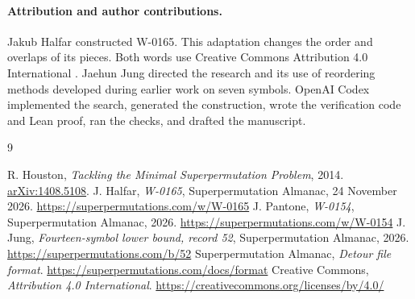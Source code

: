 \documentclass[11pt]{article}
\begin{document}
\paragraph{Attribution and author contributions.}
Jakub Halfar constructed W-0165. This adaptation changes the order and overlaps of its pieces. Both words use Creative Commons Attribution 4.0 International \cite{license}. Jaehun Jung directed the research and its use of reordering methods developed during earlier work on seven symbols. OpenAI Codex implemented the search, generated the construction, wrote the verification code and Lean proof, ran the checks, and drafted the manuscript.

\begin{thebibliography}{9}
\raggedright
{} R. Houston, \emph{Tackling the Minimal Superpermutation Problem}, 2014. \href{https://arxiv.org/abs/1408.5108}{arXiv:1408.5108}.
 J. Halfar, \emph{W-0165}, Superpermutation Almanac, 24 November 2026. \url{https://superpermutations.com/w/W-0165}
 J. Pantone, \emph{W-0154}, Superpermutation Almanac, 2026. \url{https://superpermutations.com/w/W-0154}
 J. Jung, \emph{Fourteen-symbol lower bound, record 52}, Superpermutation Almanac, 2026. \url{https://superpermutations.com/b/52}
 Superpermutation Almanac, \emph{Detour file format}. \url{https://superpermutations.com/docs/format}
 Creative Commons, \emph{Attribution 4.0 International}. \url{https://creativecommons.org/licenses/by/4.0/}
\end{thebibliography}
\end{document}
